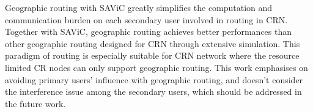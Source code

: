 Geographic routing with SAViC greatly simplifies the computation and communication burden on each secondary user involved in routing in CRN.
Together with SAViC, geographic routing achieves better performances than other geographic routing designed for CRN through extensive simulation.
This paradigm of routing is especially suitable for CRN network where the resource limited CR nodes can only support geographic routing.
This work emphasises on avoiding primary users' influence with geographic routing, and doesn't consider the interference issue among the secondary users, which should be addressed in the future work.
%
